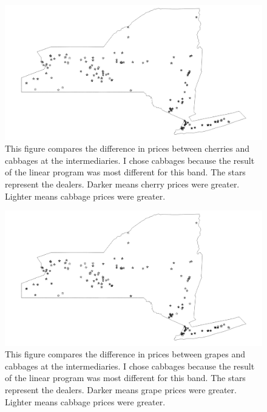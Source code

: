 \documentclass{report}
\begin{document}
\begin{figure}
\centering
\begin{framed}
\includegraphics[scale=.39]{procs_243_66}
\caption{This figure compares the difference in prices between cherries and cabbages at the intermediaries. I chose cabbages because the result of the linear program was most different for this band. The stars represent the dealers. Darker means cherry prices were greater. Lighter means cabbage prices were greater.}
\label{fig:procs_243_66}
\end{framed}
\end{figure}

\begin{figure}
\centering
\begin{framed}
\includegraphics[scale=.39]{procs_243_69}
\caption{This figure compares the difference in prices between grapes and cabbages at the intermediaries. I chose cabbages because the result of the linear program was most different for this band. The stars represent the dealers. Darker means grape prices were greater. Lighter means cabbage prices were greater.}
\label{fig:procs_243_69}
\end{framed}
\end{figure}
\end{document}

